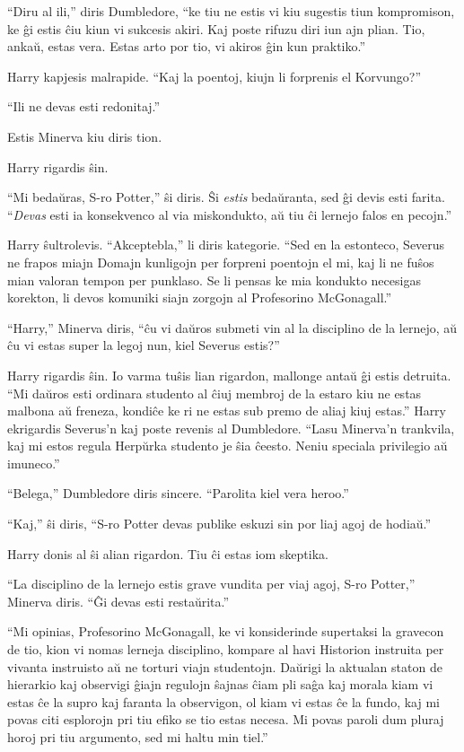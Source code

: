 ``Diru al ili,'' diris Dumbledore, ``ke tiu ne estis vi kiu sugestis
tiun kompromison, ke ĝi estis ĉiu kiun vi sukcesis akiri. Kaj poste
rifuzu diri iun ajn plian. Tio, ankaŭ, estas vera. Estas arto por tio,
vi akiros ĝin kun praktiko.''

Harry kapjesis malrapide. ``Kaj la poentoj, kiujn li forprenis el Korvungo?''

``Ili ne devas esti redonitaj.''

Estis Minerva kiu diris tion.

Harry rigardis ŝin.

``Mi bedaŭras, S-ro Potter,'' ŝi diris. Ŝi \emph{estis} bedaŭranta,
sed ĝi devis esti farita. ``\emph{Devas} esti ia konsekvenco al via
miskondukto, aŭ tiu ĉi lernejo falos en pecojn.''

Harry ŝultrolevis. ``Akceptebla,'' li diris kategorie. ``Sed en la
estonteco, Severus ne frapos miajn Domajn kunligojn per forpreni
poentojn el mi, kaj li ne fuŝos mian valoran tempon per punklaso. Se li
pensas ke mia kondukto necesigas korekton, li devos komuniki siajn
zorgojn al Profesorino McGonagall.''

``Harry,'' Minerva diris, ``ĉu vi daŭros submeti vin al la disciplino
de la lernejo, aŭ ĉu vi estas super la legoj nun, kiel Severus
estis?''

Harry rigardis ŝin. Io varma tuŝis lian rigardon, mallonge antaŭ ĝi
estis detruita. ``Mi daŭros esti ordinara studento al ĉiuj membroj de
la estaro kiu ne estas malbona aŭ freneza, kondiĉe ke ri ne estas sub
premo de aliaj kiuj estas.'' Harry ekrigardis Severus'n kaj poste
revenis al Dumbledore. ``Lasu Minerva'n trankvila, kaj mi estos regula
Herpŭrka studento je ŝia ĉeesto. Neniu speciala privilegio aŭ
imuneco.''

``Belega,'' Dumbledore diris sincere. ``Parolita kiel vera heroo.''

``Kaj,'' ŝi diris, ``S-ro Potter devas publike eskuzi sin por liaj
agoj de hodiaŭ.''

Harry donis al ŝi alian rigardon. Tiu ĉi estas iom skeptika.

``La disciplino de la lernejo estis grave vundita per viaj agoj, S-ro
Potter,'' Minerva diris. ``Ĝi devas esti restaŭrita.''

``Mi opinias, Profesorino McGonagall, ke vi konsiderinde supertaksi la
gravecon de tio, kion vi nomas lerneja disciplino, kompare al havi
Historion instruita per vivanta instruisto aŭ ne torturi viajn
studentojn. Daŭrigi la aktualan staton de hierarkio kaj observigi
ĝiajn regulojn ŝajnas ĉiam pli saĝa kaj morala kiam vi estas ĉe la
supro kaj faranta la observigon, ol kiam vi estas ĉe la fundo, kaj mi
povas citi esplorojn pri tiu efiko se tio estas necesa. Mi povas
paroli dum pluraj horoj pri tiu argumento, sed mi haltu min tiel.''

